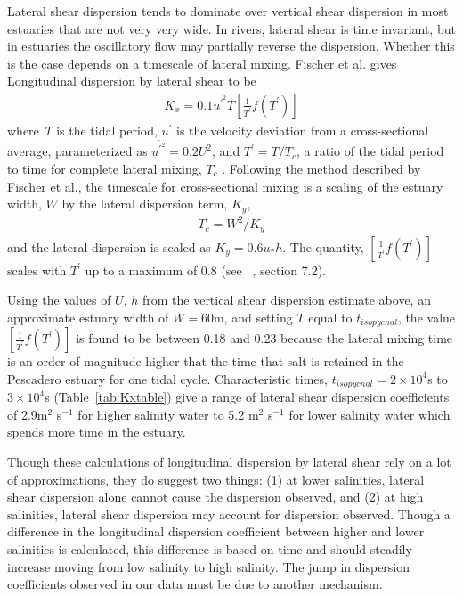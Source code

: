 Lateral shear dispersion tends to dominate over vertical shear dispersion in most estuaries that are not very very wide. In rivers, lateral shear is time invariant, but in estuaries the oscillatory flow may partially reverse the dispersion. Whether this is the case depends on a timescale of lateral mixing. Fischer et al. gives Longitudinal dispersion by lateral shear to be
\begin{eqnarray}
K_x = 0.1\overline{u^{'^2}}T\left[\frac{1}{T^{'}}f(T^{'})\right] \label{eq:Klatshear}
\end{eqnarray}
where \emph{T} is the tidal period, $u^{'}$ is the velocity deviation from a cross-sectional average, parameterized as $\overline{u^{'^2}}=0.2U^2$, and $T^{'}=T/T_c$, a ratio of the tidal period to time for complete lateral mixing, $T_c$ \parencite*{fischer_mixing_1979}. Following the method described by Fischer et al., the timescale for cross-sectional mixing is a scaling of the estuary width, $W$ by the lateral dispersion term, $K_y$, 
\begin{eqnarray}
T_c = W^2/K_y \label{eq:Tc}
\end{eqnarray}
and the lateral dispersion is scaled as $K_y = 0.6u_*h$. The quantity, $\left[\frac{1}{T^{'}}f(T^{'})\right]$ scales with $T^{'}$ up to a maximum of 0.8 (see ~\cite{fischer_mixing_1979}, section 7.2). 

Using the values of $U$, $h$ from the vertical shear dispersion estimate above, an approximate estuary width of $W=60$m, and setting $T$ equal to $t_{isopycnal}$, the value $\left[\frac{1}{T^{'}}f(T^{'})\right]$ is found to be between 0.18 and 0.23 because the lateral mixing time is an order of magnitude higher that the time that salt is retained in the Pescadero estuary for one tidal cycle. Characteristic times, $t_{isopycnal}=2\times10^4$s to $3\times10^4$s (Table~\ref{tab:Kxtable}) give a range of lateral shear dispersion coefficients of 2.9m$^2$ s$^{-1}$ for higher salinity water to 5.2 m$^2$ s$^{-1}$ for lower salinity water which spends more time in the estuary. 

Though these calculations of longitudinal dispersion by lateral shear rely on a lot of approximations, they do suggest two things: (1) at lower salinities, lateral shear dispersion alone cannot cause the dispersion observed, and (2) at high salinities, lateral shear dispersion may account for dispersion observed. Though a difference in the longitudinal dispersion coefficient between higher and lower salinities is calculated, this difference is based on time and should steadily increase moving from low salinity to high salinity. The jump in dispersion coefficients observed in our data must be due to another mechanism.  

